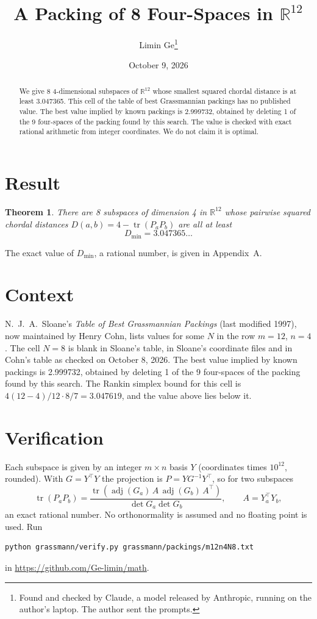 \documentclass[11pt,a4paper]{article}
\title{A Packing of 8 Four-Spaces in $\mathbb{R}^{12}$}
\author{Limin Ge\thanks{Found and checked by Claude, a model released by Anthropic, running on the author's laptop. The author sent the prompts.}}
\date{October 9, 2026}
\newtheorem*{theorem}{Theorem}
\begin{document}
\maketitle
\begin{abstract}
We give 8 4-dimensional subspaces of $\mathbb{R}^{12}$ whose smallest squared chordal distance is at least 3.047365. This cell of the table of best Grassmannian packings has no published value. The best value implied by known packings is 2.999732, obtained by deleting 1 of the 9 four-spaces of the packing found by this search. The value is checked with exact rational arithmetic from integer coordinates. We do not claim it is optimal.
\end{abstract}

\section{Result}
\begin{theorem}
There are 8 subspaces of dimension 4 in $\mathbb{R}^{12}$ whose pairwise squared chordal distances $D(a,b) = 4 - \operatorname{tr}(P_aP_b)$ are all at least
\[ D_{\min} = 3.047365\ldots \]
\end{theorem}
The exact value of $D_{\min}$, a rational number, is given in Appendix~A.


\section{Context}
N.~J.~A.~Sloane's \emph{Table of Best Grassmannian Packings} (last modified 1997), now maintained by Henry Cohn, lists values for some $N$ in the row $m=12$, $n=4$. The cell $N=8$ is blank in Sloane's table, in Sloane's coordinate files and in Cohn's table as checked on October 8, 2026. The best value implied by known packings is 2.999732, obtained by deleting 1 of the 9 four-spaces of the packing found by this search. The Rankin simplex bound for this cell is $4(12-4)/12\cdot 8/7 = 3.047619$, and the value above lies below it.


\section{Verification}
Each subspace is given by an integer $m\times n$ basis $Y$ (coordinates times $10^{12}$, rounded). With $G=Y^\top Y$ the projection is $P=YG^{-1}Y^\top$, so for two subspaces
\[ \operatorname{tr}(P_aP_b)=\frac{\operatorname{tr}(\operatorname{adj}(G_a)\,A\,\operatorname{adj}(G_b)\,A^\top)}{\det G_a\det G_b},\qquad A=Y_a^\top Y_b, \]
an exact rational number. No orthonormality is assumed and no floating point is used. Run
\begin{verbatim}
python grassmann/verify.py grassmann/packings/m12n4N8.txt
\end{verbatim}
in \url{https://github.com/Ge-limin/math}.
\end{document}
